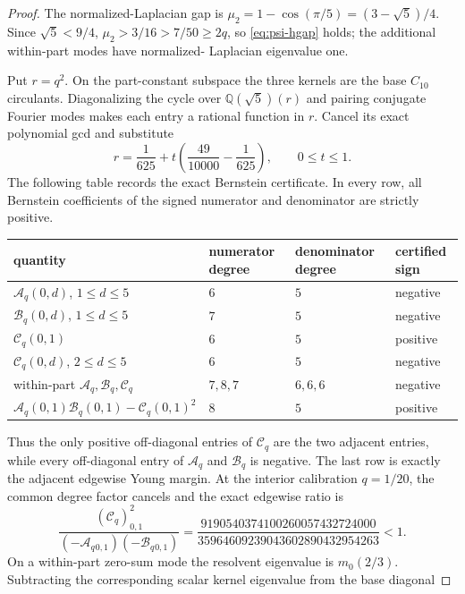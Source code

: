 \documentclass[11pt]{article}
\begin{document}
\begin{proof}
The normalized-Laplacian gap is
$\mu_2=1-\cos(\pi/5)=(3-\sqrt5)/4$.  Since $\sqrt5<9/4$,
$\mu_2>3/16>7/50\geq2q$, so
\cref{eq:psi-hgap} holds; the additional within-part modes have normalized-
Laplacian eigenvalue one.

Put $r=q^2$.  On the part-constant subspace the three kernels are the base
$C_{10}$ circulants.  Diagonalizing the cycle over
$\mathbb Q(\sqrt5)(r)$ and pairing conjugate Fourier modes makes each entry a
rational function in $r$.  Cancel its exact polynomial gcd and substitute
\[
 r=\frac1{625}
 +t\left(\frac{49}{10000}-\frac1{625}\right),
 \qquad 0\leq t\leq1.
\]
The following table records the exact Bernstein certificate.  In every row,
all Bernstein coefficients of the signed numerator and denominator are
strictly positive.
\begin{center}
\begin{tabular}{llll}
\toprule
quantity & numerator degree & denominator degree & certified sign\\
\midrule
$\mathcal A_q(0,d)$, $1\leq d\leq5$ & $6$ & $5$ & negative\\
$\mathcal B_q(0,d)$, $1\leq d\leq5$ & $7$ & $5$ & negative\\
$\mathcal C_q(0,1)$ & $6$ & $5$ & positive\\
$\mathcal C_q(0,d)$, $2\leq d\leq5$ & $6$ & $5$ & negative\\
within-part $\mathcal A_q,\mathcal B_q,\mathcal C_q$
 & $7,8,7$ & $6,6,6$ & negative\\
$\mathcal A_q(0,1)\mathcal B_q(0,1)-\mathcal C_q(0,1)^2$
 & $8$ & $5$ & positive\\
\bottomrule
\end{tabular}
\end{center}
Thus the only positive off-diagonal entries of $\mathcal C_q$ are the two
adjacent entries, while every off-diagonal entry of $\mathcal A_q$ and
$\mathcal B_q$ is negative.  The last row is exactly the adjacent edgewise
Young margin.  At the interior calibration $q=1/20$, the common degree factor
cancels and the exact edgewise ratio is
\begin{equation}
 \frac{(\mathcal C_q)_{0,1}^2}
 {(-\mathcal A_q{}_{0,1})(-\mathcal B_q{}_{0,1})}
 =\frac{9190540374100260057432724000}
 {35964609239043602890432954263}<1.
 \label{eq:psi-c10-edgewise-ratio}
\end{equation}
On a within-part zero-sum mode the resolvent eigenvalue is $m_0(2/3)$.
Subtracting the corresponding scalar kernel eigenvalue from the base diagonal

\end{proof}
\end{document}
